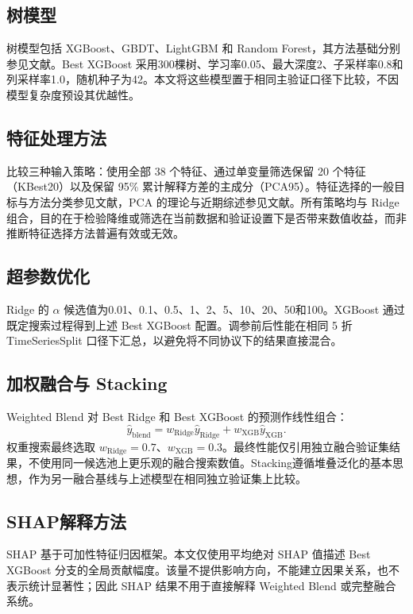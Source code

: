\documentclass[UTF8,a4paper,twocolumn,zihao=5,fontset=none]{ctexart}
\begin{document}
\subsection{树模型}
树模型包括 XGBoost、GBDT、LightGBM 和 Random Forest，其方法基础分别参见文献\citep{chen2016xgboost,friedman2001gbdt,ke2017lightgbm,breiman2001randomforest}。Best XGBoost 采用300棵树、学习率0.05、最大深度2、子采样率0.8和列采样率1.0，随机种子为42。本文将这些模型置于相同主验证口径下比较，不因模型复杂度预设其优越性。

\subsection{特征处理方法}
比较三种输入策略：使用全部 38 个特征、通过单变量筛选保留 20 个特征（KBest20）以及保留 95\% 累计解释方差的主成分（PCA95）。特征选择的一般目标与方法分类参见文献\citep{guyon2003feature_selection}，PCA 的理论与近期综述参见文献\citep{jolliffe2016pca}。所有策略均与 Ridge 组合，目的在于检验降维或筛选在当前数据和验证设置下是否带来数值收益，而非推断特征选择方法普遍有效或无效。

\subsection{超参数优化}
Ridge 的 $\alpha$ 候选值为0.01、0.1、0.5、1、2、5、10、20、50和100。XGBoost 通过既定搜索过程得到上述 Best XGBoost 配置。调参前后性能在相同 5 折 TimeSeriesSplit 口径下汇总，以避免将不同协议下的结果直接混合。

\subsection{加权融合与 Stacking}
Weighted Blend 对 Best Ridge 和 Best XGBoost 的预测作线性组合：
\begin{equation}
 \hat y_{\mathrm{blend}}=w_{\mathrm{Ridge}}\hat y_{\mathrm{Ridge}}+w_{\mathrm{XGB}}\hat y_{\mathrm{XGB}}.
\end{equation}
权重搜索最终选取 $w_{\mathrm{Ridge}}=0.7$、$w_{\mathrm{XGB}}=0.3$。最终性能仅引用独立融合验证集结果，不使用同一候选池上更乐观的融合搜索数值。Stacking遵循堆叠泛化的基本思想\citep{wolpert1992stacking}，作为另一融合基线与上述模型在相同独立验证集上比较。

\subsection{SHAP解释方法}
SHAP 基于可加性特征归因框架\citep{lundberg2017shap}。本文仅使用平均绝对 SHAP 值描述 Best XGBoost 分支的全局贡献幅度。该量不提供影响方向，不能建立因果关系，也不表示统计显著性；因此 SHAP 结果不用于直接解释 Weighted Blend 或完整融合系统。
\end{document}
